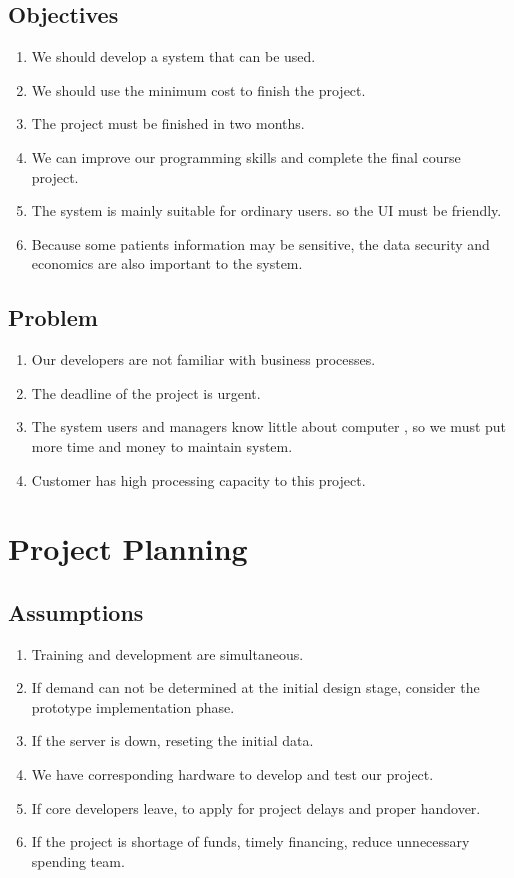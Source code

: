 \documentclass[a4paper,11pt]{article}
\begin{document}
\subsection{Objectives}
\begin{enumerate}
\item We should develop a system that can be used. 
\item We should use the minimum cost to finish the project.
\item The project must be finished in two months.
\item We can improve our programming skills and complete the final course project.
\item The system is mainly suitable for ordinary users. so the UI must be friendly.
\item Because some patients information may be sensitive, the data security and economics are also important to the system. 
\end{enumerate}

\subsection{Problem}
\begin{enumerate}
\item Our developers are not familiar with business processes.
\item The deadline of the project is urgent.
\item The system users and managers know little about computer , so we must put more time and money to maintain system.
\item Customer has high processing capacity to this project. 
\end{enumerate}

\section{Project Planning}
\subsection{Assumptions}
\begin{enumerate}
\item Training and development are simultaneous.
\item If demand can not be determined at the initial design stage, consider the prototype implementation phase.
\item If the server is down, reseting the initial data.
\item We have corresponding hardware to develop and test our project.
\item If core developers leave, to apply for project delays and proper handover.
\item If the project is shortage of funds, timely financing, reduce unnecessary spending team.
\end{enumerate}
\end{document}
